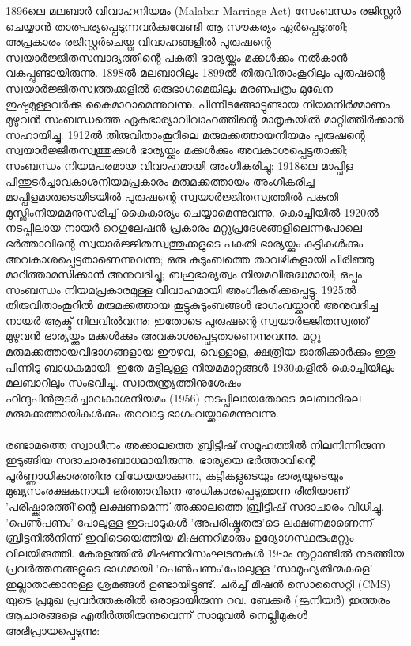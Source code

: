 \label{ch5box4} %
\begin{tcolorbox}[%
 breakable, %
  arc=0mm, 
  left=1pt, right = 1pt, 
  boxrule=0mm,
  colback = {blue!10}, %
] 

1896ലെ മലബാർ വിവാഹനിയമം (Malabar Marriage Act) സേംബന്ധം രജിസ്റ്റർ ചെയ്യാൻ താത്പര്യപ്പെടുന്നവർക്കുവേണ്ടി ആ സൗകര്യം ഏർപ്പെടുത്തി; അപ്രകാരം രജിസ്റ്റർചെയ്ത വിവാഹങ്ങളിൽ പുരുഷന്റെ സ്വയാർജ്ജിതസമ്പാദ്യത്തിന്റെ പകുതി ഭാര്യയ്ക്കും മക്കൾക്കും നൽകാൻ വകുപ്പുണ്ടായിരുന്നു. 1898ൽ മലബാറിലും 1899ൽ തിരുവിതാംകൂറിലും പുരുഷന്റെ സ്വയാർജ്ജിതസ്വത്തക്കളിൽ ഒരുഭാഗമെങ്കിലും മരണപത്രം മുഖേന ഇഷ്ടമുള്ളവർക്കു കൈമാറാമെന്നുവന്നു. പിന്നീടങ്ങോട്ടുണ്ടായ നിയമനിർമ്മാണം മുഴുവൻ സംബന്ധത്തെ ഏകഭാര്യാവിവാഹത്തിന്റെ മാതൃകയിൽ മാറ്റിത്തീർക്കാൻ സഹായിച്ചു. 1912ൽ തിരുവിതാംകൂറിലെ മരുമക്കത്തായനിയമം പുരുഷന്റെ സ്വയാർജ്ജിതസ്വത്തുക്കൾ ഭാര്യയ്ക്കും മക്കൾക്കും അവകാശപ്പെട്ടതാക്കി; സംബന്ധം നിയമപരമായ വിവാഹമായി അംഗീകരിച്ചു; 1918ലെ മാപ്പിള പിന്തുടർച്ചാവകാശനിയമപ്രകാരം മരുമക്കത്തായം അംഗീകരിച്ച മാപ്പിളമാരുടെയിടയിൽ പുരുഷന്റെ സ്വയാർജ്ജിതസ്വത്തിൽ പകുതി മുസ്ലിംനിയമമനുസരിച്ച് കൈകാര്യം ചെയ്യാമെന്നുവന്നു. കൊച്ചിയിൽ 1920ൽ നടപ്പിലായ നായർ റെഗുലേഷൻ പ്രകാരം മറ്റുപ്രദേശങ്ങളിലെന്നപോലെ ഭർത്താവിന്റെ സ്വയാർജ്ജിതസ്വത്തുക്കളുടെ പകുതി ഭാര്യയ്ക്കും കുട്ടികൾക്കും അവകാശപ്പെട്ടതാണെന്നുവന്നു; ഒരു കുടുംബത്തെ താവഴികളായി പിരിഞ്ഞു മാറിത്താമസിക്കാൻ അനുവദിച്ചു; ബഹുഭാര്യത്വം നിയമവിരുദ്ധമായി; ഒപ്പം സംബന്ധം നിയമപ്രകാരമുള്ള വിവാഹമായി അംഗീകരിക്കപ്പെട്ടു. 1925ൽ തിരുവിതാംകൂറിൽ മരുമക്കത്തായ കൂട്ടുകുടുംബങ്ങൾ ഭാഗംവയ്ക്കാൻ അനുവദിച്ച നായർ ആക്ട് നിലവിൽവന്നു; ഇതോടെ പുരുഷന്റെ സ്വയാർജ്ജിതസ്വത്ത് മുഴുവൻ ഭാര്യയ്ക്കും മക്കൾക്കും അവകാശപ്പെട്ടതാണെന്നുവന്നു. മറ്റു മരുമക്കത്തായവിഭാഗങ്ങളായ ഈഴവ, വെള്ളാള, ക്ഷത്രിയ ജാതിക്കാർക്കും ഇതു പിന്നീടു ബാധകമായി. ഇതേ മട്ടിലുള്ള നിയമമാറ്റങ്ങൾ 1930കളിൽ കൊച്ചിയിലും മലബാറിലും സംഭവിച്ചു. സ്വാതന്ത്ര്യത്തിനുശേഷം ഹിന്ദുപിൻതുടർച്ചാവകാശനിയമം (1956) നടപ്പിലായതോടെ മലബാറിലെ മരുമക്കത്തായികൾക്കും തറവാടു ഭാഗംവയ്ക്കാമെന്നുവന്നു.
\end{tcolorbox}

\paragraph{}രണ്ടാമത്തെ സ്വാധീനം അക്കാലത്തെ ബ്രിട്ടിഷ് സമൂഹത്തിൽ നിലനിന്നിരുന്ന ഇടുങ്ങിയ സദാചാരബോധമായിരുന്നു. ഭാര്യയെ ഭർത്താവിന്റെ പൂർണ്ണാധികാരത്തിനു വിധേയയാക്കുന്ന, കുട്ടികളുടെയും ഭാര്യയുടെയും മുഖ്യസംരക്ഷകനായി ഭർത്താവിനെ അധികാരപ്പെടുത്തുന്ന രീതിയാണ് 'പരിഷ്ക്കാരത്തി'ന്റെ ലക്ഷണമെന്ന് അക്കാലത്തെ ബ്രിട്ടീഷ് സദാചാരം വിധിച്ചു. 'പെൺപണം' പോലുള്ള ഇടപാടുകൾ 'അപരിഷ്കൃതരു'ടെ ലക്ഷണമാണെന്ന് ബ്രിട്ടനിൽനിന്ന് ഇവിടെയെത്തിയ മിഷണറിമാരും ഉദ്യോഗസ്ഥരുംമറ്റും വിലയിരുത്തി. കേരളത്തിൽ മിഷണറിസംഘടനകൾ 19-ാം നൂറ്റാണ്ടിൽ നടത്തിയ പ്രവർത്തനങ്ങളുടെ ഭാഗമായി 'പെൺപണം'പോലുള്ള 'സാമൂഹ്യതിന്മകളെ' ഇല്ലാതാക്കാനുള്ള ശ്രമങ്ങൾ ഉണ്ടായിട്ടുണ്ട്. ചർച്ച് മിഷൻ സൊസൈറ്റി (CMS) യുടെ പ്രമുഖ പ്രവർത്തകരിൽ ഒരാളായിരുന്ന റവ. ബേക്കർ (ജൂനിയർ) ഇത്തരം ആചാരങ്ങളെ എതിർത്തിരുന്നുവെന്ന് സാമുവൽ നെല്ലിമുകൾ അഭിപ്രായപ്പെടുന്നു:

